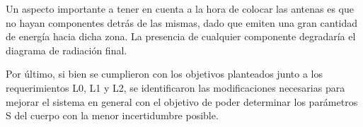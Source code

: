 Un aspecto importante a tener en cuenta a la hora de colocar las antenas es que no hayan componentes detrás de las mismas, dado que emiten una gran cantidad de energía hacia dicha zona. La presencia de cualquier componente degradaría el diagrama de radiación final.

Por último, si bien se cumplieron con los objetivos planteados junto a los requerimientos L0, L1 y L2, se identificaron las modificaciones necesarias para mejorar el sistema en general con el objetivo de poder determinar los parámetros S del cuerpo con la menor incertidumbre posible.